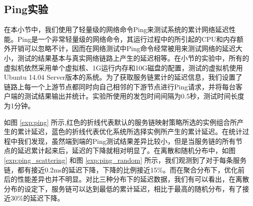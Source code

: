 \subsection{Ping实验}
在本小节中，我们使用了轻量级的网络命令Ping来测试系统的累计网络延迟性能。Ping是一个非常轻量级的网络命令，其运行过程中的所引起的CPU和内存额外开销可以忽略不计，因而在网络测试中Ping命令经常被用来测试网络的延迟大小，测试的结果基本与真实网络链路上产生的延迟相等。在小节的实验中，所有的虚拟机依然采用单个虚拟核、1G运行内存和10G磁盘的配置，测试的虚拟机使用Ubuntu 14.04 Server版本的系统。为了获取服务链累计的延迟信息，我们设置了链路上每一个上游节点都同时向自己相邻的下游节点进行Ping请求，并将每台客户端的测试结果输出并统计。实验所使用的发包时间间隔为0.5秒，测试时间长度为1分钟。
\begin{figure}[!htp]
	\centering
	
\end{figure}
\begin{figure}
	\addtocounter{subfigure}{2}
	\ContinuedFloat
	\centering

\end{figure}

如图 \ref{exp:ping} 所示,红色的折线代表默认的服务链映射策略所选的实例组合所产生的累计延迟，蓝色的折线代表优化系统所选择实例所产生的累计延迟。在统计过程中我们发现，虽然端到端的Ping测试结果差异比较小，但是当服务链的所有节点的延迟累计起来后，延迟的下降就相对明显了。在离散和随机分布中，如图 \ref{exp:ping_scattering} 和图 \ref{exp:ping_random} 所示，我们观测到了对于每条服务链，都有接近0.2ms的延迟下降，下降的比例接近15\%。而在聚合分布下，优化前后的性能差异也并不明显。对比三种分布下的延迟数据，我们有可以看出，在离散分布的设定下，服务链可以达到最低的累计延迟，相比于最高的随机分布，有了接近30\%的延迟下降。


